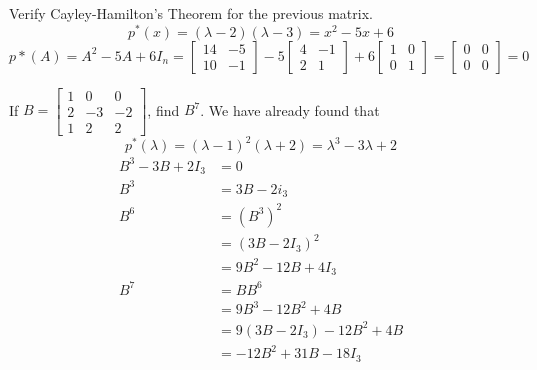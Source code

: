 \documentclass[12pt]{article}
\begin{document}
\begin{example} Verify Cayley-Hamilton's Theorem for the previous matrix. $$ p^*(x) = (\lambda - 2)(\lambda - 3) = x^2 - 5x + 6 $$ $$ p*(A) = A^2 - 5A + 6I_n = \begin{bmatrix} 14 & -5 \\ 10 & -1 \end{bmatrix} -5\begin{bmatrix} 4 & -1 \\ 2 & 1 \end{bmatrix} + 6\begin{bmatrix} 1 & 0 \\ 0 & 1 \end{bmatrix} = \begin{bmatrix} 0 & 0 \\ 0 & 0 \end{bmatrix} = 0 $$ \end{example} 
\begin{example} If $B = \begin{bmatrix} 1 & 0 & 0 \\ 2 & -3 & -2 \\ 1 & 2 & 2 \end{bmatrix}$, find $B^7$. \newline We have already found that $$p^*(\lambda) = (\lambda - 1)^2(\lambda + 2) = \lambda^3 -3\lambda + 2 $$ $$\begin{aligned} B^3 - 3B + 2I_3 &= 0 \\ B^3 &= 3B - 2i_3 \\ B^6 &= (B^3)^2 \\ &= (3B - 2I_3)^2 \\ &= 9B^2 - 12B + 4I_3 \\ B^7 &= BB^6 \\ &= 9B^3 - 12B^2 + 4B \\ &= 9(3B - 2I_3) - 12B^2 + 4B \\ &= -12B^2 + 31B - 18I_3 \end{aligned} $$ \end{example} \newpage
\end{document}
